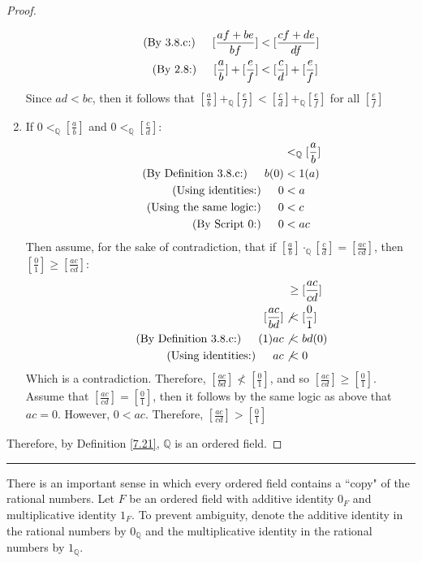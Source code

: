 \documentclass[openany, amssymb, psamsfonts]{amsart}
\newcommand{\bbQ}{\mathbb{Q}}
\theoremstyle{definition}
\numberwithin{equation}{section}
\begin{document}
\begin{proof}
\begin{enumerate}
\begin{align*}
        \tag{By 3.8.c:} \indent [\frac{af+be}{bf}] &< [\frac{cf+de}{df}]\\
        \tag{By 2.8:}\indent [\frac{a}{b}]+ [\frac{e}{f}] &< [\frac{c}{d}]+[\frac{e}{f}]
    \end{align*}
    Since $ad<bc$, then it follows that $[\frac{a}{b}]+_\bbQ [\frac{e}{f}]<[\frac{c}{d}]+_\bbQ [\frac{e}{f}]$ for all $[\frac{e}{f}]$
    \item If $0<_\bbQ [\frac{a}{b}]$ and $0<_\bbQ [\frac{c}{d}]$:
    \begin{align*}
        [\frac{0}{1}]&<_\bbQ [\frac{a}{b}]\\
        \tag{By Definition 3.8.c:} \indent b(0)&<1(a)\\
        \tag{Using identities:} \indent 0&<a\\
        \tag{Using the same logic:} \indent 0&<c\\
        \tag{By Script 0:} \indent 0&<ac\\
    \end{align*} 
    Then assume, for the sake of contradiction, that if $[\frac{a}{b}] \cdot _\bbQ [\frac{c}{d}] = [\frac{ac}{cd}]$, then $[\frac{0}{1}]\geq [\frac{ac}{cd}]$:
    \begin{align*}
        [\frac{0}{1}]&\geq [\frac{ac}{cd}]\\
        [\frac{ac}{bd}] \not &< [\frac{0}{1}]\\
        \tag{By Definition 3.8.c:}  \indent (1)ac\not &< bd(0)\\
        \tag{Using identities:} \indent ac \not &< 0 
    \end{align*}
    Which is a contradiction. Therefore, $[\frac{ac}{bd}] \not < [\frac{0}{1}]$, and so $ [\frac{ac}{cd}] \geq [\frac{0}{1}]$. Assume that $ [\frac{ac}{cd}] = [\frac{0}{1}]$, then it follows by the same logic as above that $ac = 0$. However, $0<ac$. Therefore, $ [\frac{ac}{cd}] > [\frac{0}{1}]$
\end{enumerate}
Therefore, by Definition \ref{7.21}, $\bbQ$ is an ordered field.
\end{proof}
\vspace{4pt}     \hrule   \vspace{4pt}

There is an important sense in which every ordered field contains a ``copy" of the rational numbers. Let $F$ be an ordered field with additive identity $0_F$ and multiplicative identity $1_F$. To prevent ambiguity, denote the additive identity in the rational numbers by $0_\bbQ$ and the multiplicative identity in the rational numbers by $1_\bbQ$.\medskip
\end{document}
